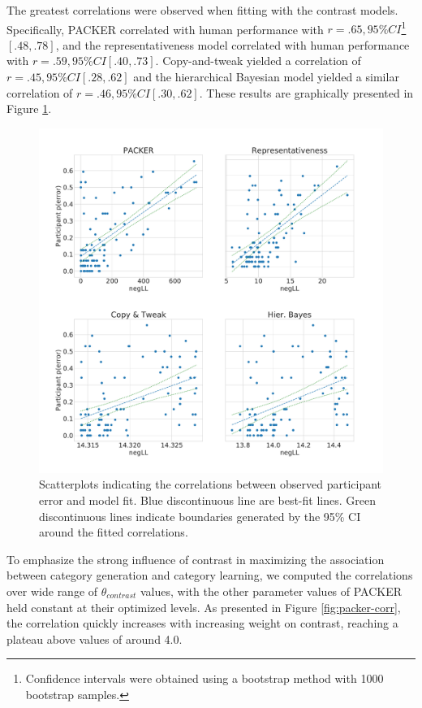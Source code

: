 The greatest correlations were observed when fitting with the contrast models.
Specifically, PACKER correlated with human performance with
$r = .65, 95\% CI$\footnote{Confidence intervals were obtained using a bootstrap
  method with 1000 bootstrap samples.}$ [.48,.78]$, and the representativeness
model correlated with human performance with $r = .59, 95\% CI [.40, .73]$.
Copy-and-tweak yielded a correlation of $r = .45, 95\% CI [.28, .62]$ and the
hierarchical Bayesian model yielded a similar correlation of
$r = .46, 95\% CI [.30, .62]$. These results are graphically presented in Figure
\ref{fig:perror_corr}.

\begin{figure}
    \begin{center}
    \includegraphics[width=\textwidth]{figs/modelvspptp.pdf}
    \caption{Scatterplots indicating the correlations between observed
      participant error and model fit. Blue discontinuous line are best-fit
      lines. Green discontinuous lines indicate boundaries generated by the 95\%
      CI around the fitted correlations. }
    \label{fig:perror_corr}
    \end{center}
\end{figure}

To emphasize the strong influence of contrast in maximizing the association
between category generation and category learning, we computed the correlations
over wide range of $\theta_{contrast}$ values, with the other parameter values
of PACKER held constant at their optimized levels. As presented in Figure
\ref{fig:packer-corr}, the correlation quickly increases with increasing weight
on contrast, reaching a plateau above values of around 4.0.

